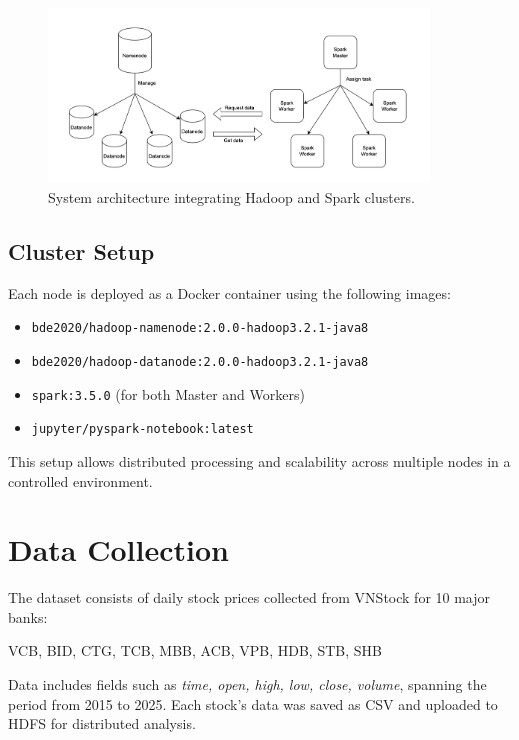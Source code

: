 \documentclass[12pt,a4paper]{article}
\begin{document}
\begin{figure}[h!]
    \centering
    \includegraphics[width=0.9\textwidth]{architecture.png}
    \caption{System architecture integrating Hadoop and Spark clusters.}
\end{figure}

\subsection{Cluster Setup}
Each node is deployed as a Docker container using the following images:

\begin{itemize}
    \item \texttt{bde2020/hadoop-namenode:2.0.0-hadoop3.2.1-java8}
    \item \texttt{bde2020/hadoop-datanode:2.0.0-hadoop3.2.1-java8}
    \item \texttt{spark:3.5.0} (for both Master and Workers)
    \item \texttt{jupyter/pyspark-notebook:latest}
\end{itemize}

This setup allows distributed processing and scalability across multiple nodes in a controlled environment.

\section{Data Collection}

The dataset consists of daily stock prices collected from VNStock for 10 major banks:

\begin{center}
VCB, BID, CTG, TCB, MBB, ACB, VPB, HDB, STB, SHB
\end{center}

Data includes fields such as \textit{time, open, high, low, close, volume}, spanning the period from 2015 to 2025.  
Each stock’s data was saved as CSV and uploaded to HDFS for distributed analysis.
\end{document}
